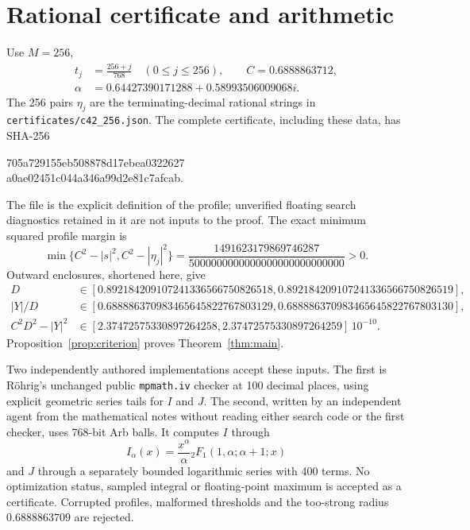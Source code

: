 \documentclass[11pt]{amsart}
\begin{document}
\section{Rational certificate and arithmetic}
Use $M=256$,
\begin{align*}
 t_j&=\frac{256+j}{768}\quad(0\le j\le256),\qquad C=0.6888863712,\\
 \alpha&=0.64427390171288+0.58993506009068i.
\end{align*}
The 256 pairs $\eta_j$ are the terminating-decimal rational strings in
\texttt{certificates/c42\_256.json}. The complete certificate, including
these data, has SHA-256
\begin{center}\small\ttfamily
705a729155eb508878d17ebea0322627\\
a0ae02451c044a346a99d2e81c7afcab.
\end{center}
The file is the explicit definition of the profile; unverified floating
search diagnostics retained in it are not inputs to the proof.
The exact minimum squared profile margin is
\[
 \min\{C^2-|s|^2,C^2-|\eta_j|^2\}
 =\frac{1491623179869746287}{5000000000000000000000000000}>0.
\]
Outward enclosures, shortened here, give
\begin{align*}
 D&\in[0.892184209107241336566750826518,
          0.892184209107241336566750826519],\\
 |Y|/D&\in[0.688886370983465645822767803129,
             0.688886370983465645822767803130],\\
 C^2D^2-|Y|^2&\in[2.37472575330897264258,
                      2.37472575330897264259]\,10^{-10}.
\end{align*}
Proposition~\ref{prop:criterion} proves Theorem~\ref{thm:main}.

Two independently authored implementations accept these inputs. The first
is R\"ohrig's unchanged public \texttt{mpmath.iv} checker at 100 decimal
places, using explicit geometric series tails for $I$ and $J$.
The second, written by an independent agent from the mathematical notes
without reading either search code or the first checker, uses 768-bit
Arb balls. It computes $I$ through
\[
 I_\alpha(x)=\frac{x^\alpha}{\alpha}
 {}_2F_1(1,\alpha;\alpha+1;x)
\]
and $J$ through a separately bounded logarithmic series with 400 terms.
No optimization status, sampled integral or floating-point maximum is
accepted as a certificate. Corrupted profiles, malformed thresholds and
the too-strong radius $0.6888863709$ are rejected.
\end{document}
